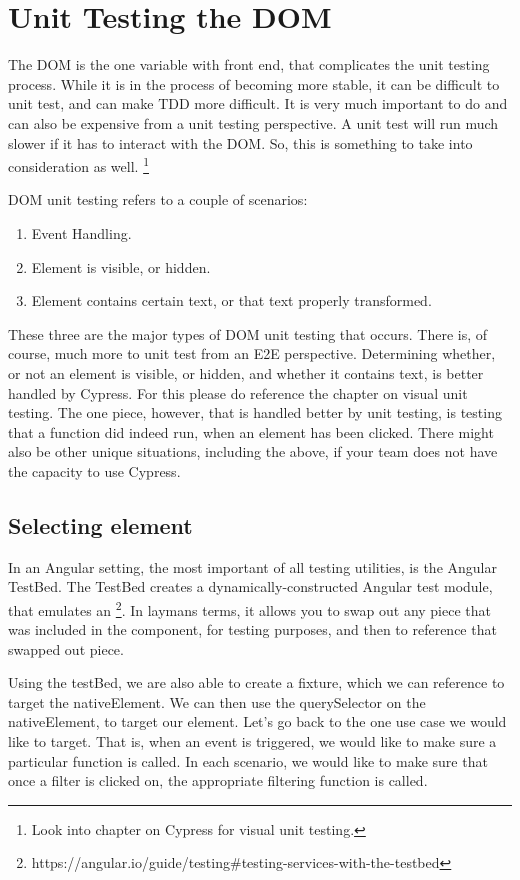 
\section{ Unit Testing the DOM }
The DOM is the one variable with front end, that complicates the unit testing
process. While it is in the process of becoming more stable, it can be difficult
to unit test, and can make TDD more difficult. It is very much important to do
and can also be expensive from a unit testing perspective. A unit test will
run much slower if it has to interact with the DOM. So, this is something to
take into consideration as well. \footnote{Look into chapter on Cypress for
visual unit testing.}

DOM unit testing refers to a couple of scenarios:
\begin{enumerate}
  \item Event Handling.
  \item Element is visible, or hidden.
  \item Element contains certain text, or that text properly transformed.
\end{enumerate}

These three are the major types of DOM unit testing that occurs. There is, of
course, much more to unit test from an E2E perspective. Determining whether, or
not an element is visible, or hidden, and whether it contains text, is better
handled by Cypress. For this please do reference the chapter on visual unit
testing. The one piece, however, that is handled better by unit testing, is
testing that a function did indeed run, when an element has been clicked. There
might also be other unique situations, including the above, if your team does
not have the capacity to use Cypress.

\subsection{ Selecting element }
In an Angular setting, the most important of all testing utilities, is the
Angular TestBed. The TestBed creates a dynamically-constructed Angular test
module, that emulates an \@NgModule \footnote{https://angular.io/guide/testing\#testing-services-with-the-testbed}. In laymans terms, it allows you to swap out any
piece that was included in the component, for testing purposes, and then to
reference that swapped out piece.

Using the testBed, we are also able to create a fixture, which we can reference
to target the nativeElement. We can then use the querySelector on the
nativeElement, to target our element. Let's go back to the one use case we
would like to target. That is, when an event is triggered, we would like to
make sure a particular function is called. In each scenario, we would like to
make sure that once a filter is clicked on, the appropriate filtering function
is called.

